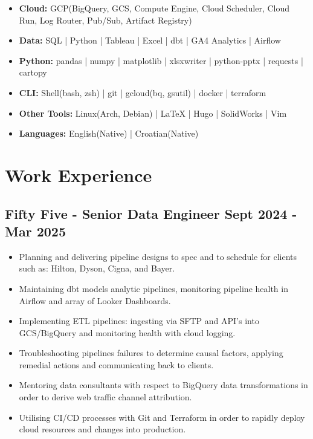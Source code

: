 \documentclass[a4paper, 9pt]{article}
\begin{document}
\begin{itemize}[itemsep=0.0em]
    \item[] \faCloud \hspace{1mm} \textbf{Cloud:} \hspace{8.7mm} GCP(BigQuery, GCS, Compute Engine, Cloud Scheduler, Cloud Run, Log Router, Pub/Sub, Artifact Registry)
    \item[] \faBarChart \hspace{1mm} \textbf{Data:} \hspace{10.5mm}  SQL | Python | Tableau | Excel | dbt | 
GA4 Analytics | Airflow
    \item[] \faCog \hspace{1mm} \textbf{Python:} \hspace{7.6mm} pandas | numpy | matplotlib | xlsxwriter | python-pptx | requests | cartopy
    \item[] \faTerminal \hspace{1mm} \textbf{CLI:} \hspace{13.6mm} Shell(bash, zsh) | git |  gcloud(bq, gsutil) | docker | terraform
    \item[] \faWrench \hspace{1mm} \textbf{Other Tools:} \hspace{0.0mm}  Linux(Arch, Debian) |  LaTeX  | Hugo | SolidWorks | Vim
    \item[] \faLanguage \hspace{1mm} \textbf{Languages:} \hspace{1.5mm} English(Native) |  Croatian(Native)
\end{itemize}

\section*{Work Experience}

\subsection*{\textbf{Fifty Five - Senior Data Engineer} \hfill  Sept 2024 - Mar 2025}
\begin{itemize}[noitemsep]
    \item Planning and delivering pipeline designs to spec and to schedule for clients such as: Hilton, Dyson, Cigna, and Bayer.
    \item Maintaining dbt models analytic pipelines, monitoring pipeline health in Airflow and array of Looker Dashboards.
    \item Implementing ETL pipelines: ingesting via SFTP and API's into GCS/BigQuery and monitoring health with cloud logging.
    \item Troubleshooting pipelines failures to determine causal factors, applying remedial actions and communicating back to clients.
    \item Mentoring data consultants with respect to BigQuery data transformations in order to derive web traffic channel attribution.
    \item Utilising CI/CD processes with Git and Terraform in order to rapidly deploy cloud resources and changes into production.
\end{itemize}
\end{document}
